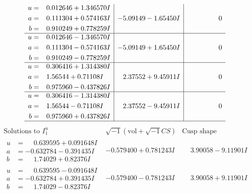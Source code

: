 \documentclass[1p]{elsarticle_modified}
\theoremstyle{definition}
\newcommand{\I}{\sqrt{-1}}
\begin{document}
$$\begin{array}{c|c|c}
\begin{aligned}
u &= \phantom{-}0.012646 + 1.346570 I \\
a &= \phantom{-}0.111304 + 0.574163 I \\
b &= \phantom{-}0.910249 + 0.778259 I\end{aligned}
 & -5.09149 - 1.65450 I & \phantom{-0.000000 } 0 \\ \hline\begin{aligned}
u &= \phantom{-}0.012646 - 1.346570 I \\
a &= \phantom{-}0.111304 - 0.574163 I \\
b &= \phantom{-}0.910249 - 0.778259 I\end{aligned}
 & -5.09149 + 1.65450 I & \phantom{-0.000000 } 0 \\ \hline\begin{aligned}
u &= \phantom{-}0.306416 + 1.314380 I \\
a &= \phantom{-}1.56544 + 0.71108 I \\
b &= \phantom{-}0.975960 - 0.437826 I\end{aligned}
 & \phantom{-}2.37552 + 9.45911 I & \phantom{-0.000000 } 0 \\ \hline\begin{aligned}
u &= \phantom{-}0.306416 - 1.314380 I \\
a &= \phantom{-}1.56544 - 0.71108 I \\
b &= \phantom{-}0.975960 + 0.437826 I\end{aligned}
 & \phantom{-}2.37552 - 9.45911 I & \phantom{-0.000000 } 0\\
 \hline 
 \end{array}$$\newpage$$\begin{array}{c|c|c}  
\text{Solutions to }I^u_{1}& \I (\text{vol} + \sqrt{-1}CS) & \text{Cusp shape}\\
 \hline 
\begin{aligned}
u &= \phantom{-}0.639595 + 0.091648 I \\
a &= -0.632784 - 0.391435 I \\
b &= \phantom{-}1.74029 + 0.82376 I\end{aligned}
 & -0.579400 + 0.781243 I & \phantom{-}3.90058 - 9.11901 I \\ \hline\begin{aligned}
u &= \phantom{-}0.639595 - 0.091648 I \\
a &= -0.632784 + 0.391435 I \\
b &= \phantom{-}1.74029 - 0.82376 I\end{aligned}
 & -0.579400 - 0.781243 I & \phantom{-}3.90058 + 9.11901 I \\ \hline\begin{aligned}

\end{aligned}
\end{array}$$
\end{document}
